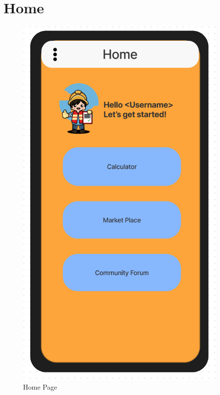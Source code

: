 \documentclass[title page]{article}
\begin{document}
\section{Home}
\begin{figure}[!h]
    \begin{center}
          \includegraphics[height=19cm]{home.png}
          \caption{Home Page}
          \label{fig:home}
    \end{center}
\end{figure}
\end{document}
